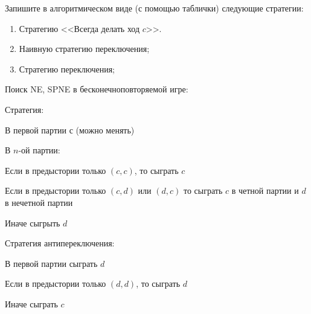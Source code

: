 \begin{problem}

Запишите в алгоритмическом виде (с помощью таблички) следующие стратегии:
\begin{enumerate}
\item  Стратегию <<Всегда делать ход  $c$>>.\par
\item Наивную стратегию переключения;\par
\item  Стратегию переключения;
\end{enumerate}


\begin{sol}

\end{sol}
\end{problem}



\begin{problem}
 Поиск NE, SPNE в бесконечноповторяемой игре: \par
Стратегия: \par
В первой партии с (можно менять) \par
В $n$-ой партии:\par
Если в предыстории только $(c,c)$, то сыграть $c$ \par
Если в предыстории только $(c,d)$ или $(d,c)$ то сыграть $c$ в
четной партии и
$d$ в нечетной партии \par
Иначе сыгрыть $d$ \par

Стратегия антипереключения: \par
В первой партии сыграть $d$ \par
Если в предыстории только $(d,d)$, то сыграть $d$ \par
Иначе сыграть $c$



\begin{sol}

\end{sol}
\end{problem}



